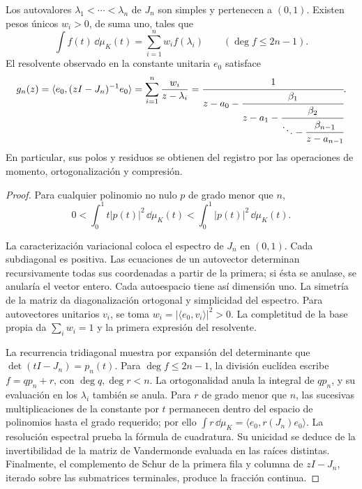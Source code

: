 \begin{theorem}
\label{thm:jacobi-residues}
Los autovalores \(\lambda_1<\cdots<\lambda_n\) de \(J_n\) son
simples y pertenecen a \((0,1)\). Existen pesos únicos
\(w_i>0\), de suma uno, tales que
\begin{equation}
 \int f(t)\,\dd\mu_K(t)=\sum_{i=1}^{n}w_i f(\lambda_i)
 \qquad(\deg f\leq2n-1).
 \label{eq:jacobi-quadrature}
\end{equation}
El resolvente observado en la constante unitaria \(e_0\) satisface
\begin{equation}
 g_n(z)=\langle e_0,(zI-J_n)^{-1}e_0\rangle
       =\sum_{i=1}^{n}\frac{w_i}{z-\lambda_i}
       =\cfrac1{z-a_0-\cfrac{\beta_1}{z-a_1-
          \cfrac{\beta_2}{\ddots-\cfrac{\beta_{n-1}}{z-a_{n-1}}}}}.
 \label{eq:jacobi-resolvent}
\end{equation}
En particular, sus polos y residuos se obtienen del registro por las
operaciones de momento, ortogonalización y compresión.
\end{theorem}
\begin{proof}
Para cualquier polinomio no nulo \(p\) de grado menor que \(n\),
\[
 0<\int_0^1 t|p(t)|^2\,\dd\mu_K(t)
   <\int_0^1 |p(t)|^2\,\dd\mu_K(t).
\]

La caracterización variacional coloca el espectro de \(J_n\) en
\((0,1)\). Cada subdiagonal es positiva. Las ecuaciones de un autovector
determinan recursivamente todas sus coordenadas a partir de la primera;
si ésta se anulase, se anularía el vector entero. Cada autoespacio tiene
así dimensión uno. La simetría de la matriz da diagonalización ortogonal
y simplicidad del espectro. Para autovectores unitarios \(v_i\), se toma
\(w_i=|\langle e_0,v_i\rangle|^2>0\). La completitud de la base
propia da \(\sum_iw_i=1\) y la primera expresión del resolvente.

La recurrencia tridiagonal muestra por expansión del determinante que
\(\det(tI-J_n)=p_n(t)\). Para \(\deg f\leq2n-1\), la división
euclídea escribe \(f=qp_n+r\), con \(\deg q,\deg r<n\).
La ortogonalidad anula la integral de \(qp_n\), y su evaluación en los
\(\lambda_i\) también se anula. Para \(r\) de grado menor que
\(n\), las sucesivas multiplicaciones de la constante por \(t\)
permanecen dentro del espacio de polinomios hasta el grado requerido;
por ello \(\int r\,\dd\mu_K=\langle e_0,r(J_n)e_0\rangle\).
La resolución espectral prueba la fórmula de cuadratura. Su unicidad
se deduce de la invertibilidad de la matriz de Vandermonde evaluada
en las raíces distintas. Finalmente, el complemento de Schur de la
primera fila y columna de \(zI-J_n\), iterado sobre las submatrices
terminales, produce la fracción continua.
\end{proof}

